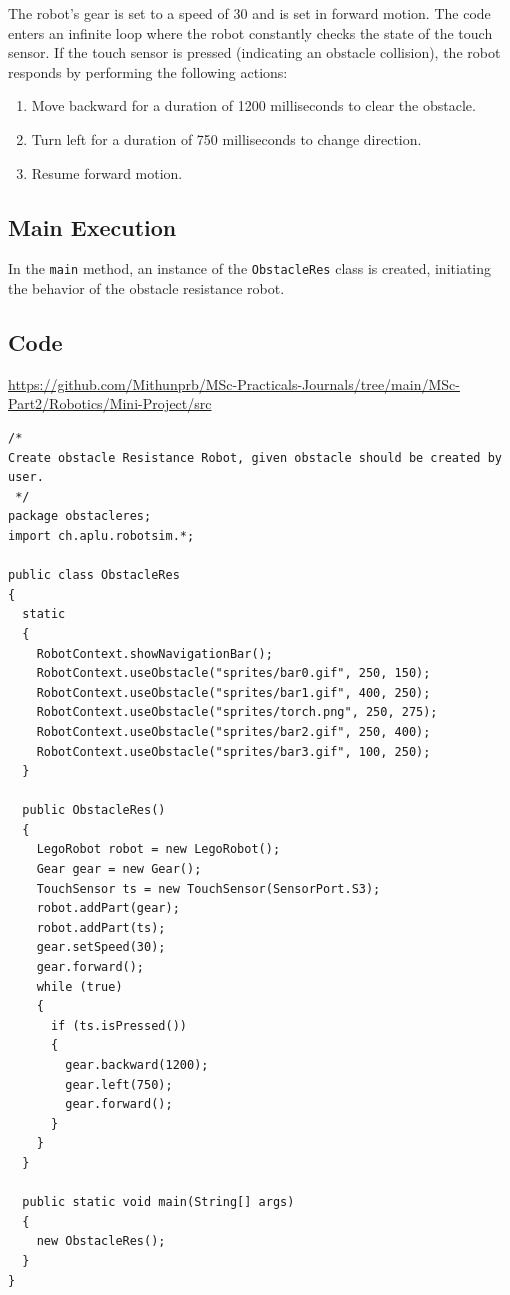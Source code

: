 The robot's gear is set to a speed of 30 and is set in forward motion. The code enters an infinite loop where the robot constantly checks the state of the touch sensor. If the touch sensor is pressed (indicating an obstacle collision), the robot responds by performing the following actions:
\begin{enumerate}
    \item Move backward for a duration of 1200 milliseconds to clear the obstacle.
    \item Turn left for a duration of 750 milliseconds to change direction.
    \item Resume forward motion.
\end{enumerate}

\subsection{Main Execution}

In the \texttt{main} method, an instance of the \texttt{ObstacleRes} class is created, initiating the behavior of the obstacle resistance robot.



    
\subsection{Code}

\label{subsec:code-first-n-follow}
\href{https://github.com/Mithunprb/MSc-Practicals-Journals/tree/main/MSc-Part2/Robotics/Mini-Project/src}{https://github.com/Mithunprb/MSc-Practicals-Journals/tree/main/MSc-Part2/Robotics/Mini-Project/src}  \\

\begin{verbatim}
/*
Create obstacle Resistance Robot, given obstacle should be created by user.
 */
package obstacleres;
import ch.aplu.robotsim.*;

public class ObstacleRes
{
  static
  {
    RobotContext.showNavigationBar();
    RobotContext.useObstacle("sprites/bar0.gif", 250, 150);
    RobotContext.useObstacle("sprites/bar1.gif", 400, 250);
    RobotContext.useObstacle("sprites/torch.png", 250, 275);
    RobotContext.useObstacle("sprites/bar2.gif", 250, 400);
    RobotContext.useObstacle("sprites/bar3.gif", 100, 250);
  }

  public ObstacleRes()
  {
    LegoRobot robot = new LegoRobot();
    Gear gear = new Gear();
    TouchSensor ts = new TouchSensor(SensorPort.S3);
    robot.addPart(gear);
    robot.addPart(ts);
    gear.setSpeed(30);
    gear.forward();
    while (true)
    {
      if (ts.isPressed())
      {
        gear.backward(1200);
        gear.left(750);
        gear.forward();
      }
    }
  }

  public static void main(String[] args)
  {
    new ObstacleRes();
  }
}
\end{verbatim}
\newpage
